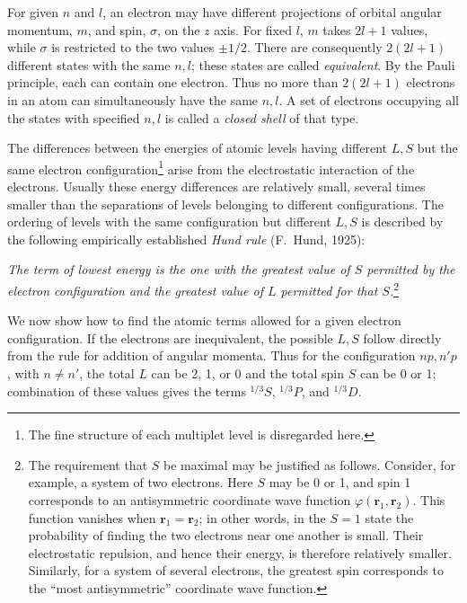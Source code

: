 For given $n$ and $l$, an electron may have different projections of orbital angular momentum, $m$, and spin, $\sigma$, on the $z$ axis. For fixed $l$, $m$ takes $2l+1$ values, while $\sigma$ is restricted to the two values $\pm1/2$. There are consequently $2(2l+1)$ different states with the same $n,l$; these states are called \emph{equivalent}. By the Pauli principle, each can contain one electron. Thus no more than $2(2l+1)$ electrons in an atom can simultaneously have the same $n,l$. A set of electrons occupying all the states with specified $n,l$ is called a \emph{closed shell} of that type.

The differences between the energies of atomic levels having different $L,S$ but the same electron configuration\footnote{The fine structure of each multiplet level is disregarded here.} arise from the electrostatic interaction of the electrons. Usually these energy differences are relatively small, several times smaller than the separations of levels belonging to different configurations. The ordering of levels with the same configuration but different $L,S$ is described by the following empirically established \emph{Hund rule} (F.~Hund, 1925):

\emph{The term of lowest energy is the one with the greatest value of $S$ permitted by the electron configuration and the greatest value of $L$ permitted for that $S$.}\footnote{The requirement that $S$ be maximal may be justified as follows. Consider, for example, a system of two electrons. Here $S$ may be 0 or 1, and spin 1 corresponds to an antisymmetric coordinate wave function $\varphi(\mathbf r_1,\mathbf r_2)$. This function vanishes when $\mathbf r_1=\mathbf r_2$; in other words, in the $S=1$ state the probability of finding the two electrons near one another is small. Their electrostatic repulsion, and hence their energy, is therefore relatively smaller. Similarly, for a system of several electrons, the greatest spin corresponds to the ``most antisymmetric'' coordinate wave function.}

We now show how to find the atomic terms allowed for a given electron configuration. If the electrons are inequivalent, the possible $L,S$ follow directly from the rule for addition of angular momenta. Thus for the configuration $np,n'p$, with $n\ne n'$, the total $L$ can be 2, 1, or 0 and the total spin $S$ can be 0 or 1; combination of these values gives the terms ${}^{1/3}S$, ${}^{1/3}P$, and ${}^{1/3}D$.

